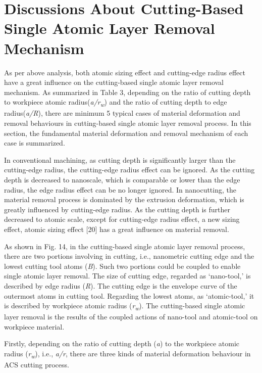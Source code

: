 \documentclass{article}
\begin{document}
\section*{Discussions About Cutting-Based Single Atomic Layer Removal Mechanism}

As per above analysis, both atomic sizing effect and cutting-edge radius effect have a great influence on the cutting-based single atomic layer removal mechanism. As summarized in Table 3, depending on the ratio of cutting depth to workpiece atomic radius(\emph{a/r}\textsubscript{\emph{w}}) and the ratio of cutting depth to edge radius(\emph{a/R}), there are minimum 5 typical cases of material deformation and removal behaviours in cutting-based single atomic layer removal process. In this section, the fundamental material deformation and removal mechanism of each case is summarized.

In conventional machining, as cutting depth is significantly larger than the cutting-edge radius, the cutting-edge radius effect can be ignored. As the cutting depth is decreased to nanoscale, which is comparable or lower than the edge radius, the edge radius effect can be no longer ignored. In nanocutting, the material removal process is dominated by the extrusion deformation, which is greatly influenced by cutting-edge radius. As the cutting depth is further decreased to atomic scale, except for cutting-edge radius effect, a new sizing effect, atomic sizing effect [20] has a great influence on material removal.

As shown in Fig. 14, in the cutting-based single atomic layer removal process, there are two portions involving in cutting, i.e., nanometric cutting edge and the lowest cutting tool atoms (\emph{B}). Such two portions could be coupled to enable single atomic layer removal. The size of cutting edge, regarded as ‘nano-tool,’ is described by edge radius (\emph{R}). The cutting edge is the envelope curve of the outermost atoms in cutting tool. Regarding the lowest atoms, as ‘atomic-tool,’ it is described by workpiece atomic radius (\emph{r}\textsubscript{\emph{w}}). The cutting-based single atomic layer removal is the results of the coupled actions of nano-tool and atomic-tool on workpiece material.

Firstly, depending on the ratio of cutting depth (\emph{a}) to the workpiece atomic radius (\emph{r}\textsubscript{\emph{w}}), i.e., \emph{a/r}, there are three kinds of material deformation behaviour in ACS cutting process.
\end{document}
